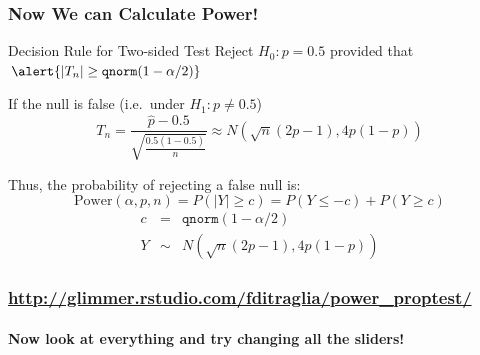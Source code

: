 \documentclass[handout]{beamer}
\begin{document}
\begin{frame}
\frametitle{Now We can Calculate Power!}
\small
\begin{block}{Decision Rule for Two-sided Test}
Reject $H_0\colon p = 0.5$ provided that $\alert{|T_n| \geq \texttt{qnorm}(1 - \alpha/2)}$
\end{block}

\begin{block}{If the null is false (i.e.\ under $H_1\colon p \neq 0.5$)}
	$$T_n = \frac{\widehat{p} - 0.5}{\sqrt{\frac{0.5(1-0.5)}{n}}} \approx N\left(\sqrt{n}(2p-1), 4 p(1-p)  \right)$$
\end{block}
\begin{block}{Thus, the probability of rejecting a false null is:}
	$$\boxed{\mbox{Power}(\alpha, p, n) = P\left( |Y| \geq c\right)  = P(Y \leq -c) + P(Y\geq c)}$$
		\begin{eqnarray*}
			 c &=&\texttt{qnorm}(1 - \alpha/2) \\
			 Y &\sim& N\left(\sqrt{n}(2p-1), 4 p(1-p)  \right)
		 \end{eqnarray*} 
\end{block}
\end{frame}
\begin{frame}
	\frametitle{\href{http://glimmer.rstudio.com/fditraglia/power_proptest/}{http://glimmer.rstudio.com/fditraglia/power\_proptest/}}
\framesubtitle{Now look at everything and try changing all the sliders!}

\begin{figure}
\end{figure}

\end{frame}
\end{document}
